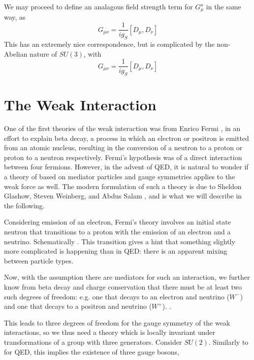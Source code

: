 We may proceed to define an analagous field strength term for $G_{\mu}^{a}$ in the same way, as
\begin{equation}
G_{\mu\nu} = \frac{1}{ig_{S}}[D_{\mu}, D_{\nu}]
\end{equation}
This has an extremely nice correspondence, but is complicated by the non-Abelian nature of $SU(3)$, with
\begin{equation}
G_{\mu\nu} = \frac{1}{ig_{S}}[D_{\mu}, D_{\nu}]
\end{equation}

\section{The Weak Interaction}
One of the first theories of the weak interaction was from Enrico Fermi , in an effort to 
explain beta decay, a process in which an electron or positron is emitted from an atomic nucleus, resulting 
in the conversion of a neutron to a proton or proton to a neutron respectively. Fermi's hypothesis was 
of a direct interaction between four fermions. However, in the advent of QED, it is natural to wonder if 
a theory of based on mediator particles and gauge symmetries applies to the weak force as well. The modern formulation 
of such a theory is due to Sheldon Glashow, Steven Weinberg, and Abdus Salam , and is what we will 
describe in the following.

Considering emission of an electron, Fermi's theory involves an initial state neutron that transitions 
to a proton with the emission of an electron and a neutrino. Schematically . 
This transition gives a hint that something slightly more complicated is happening than in QED: there is 
an apparent mixing between particle types. 

Now, with the assumption there are mediators for such an interaction, we further know from beta decay and 
charge conservation that there must be at least two such degrees of freedom: e.g. one that decays to an electron 
and neutrino ($W^{-}$) and one that decays to a positron and neutrino ($W^{+}$). .

This leads to three degrees of freedom for the gauge symmetry of the weak interactions, so we thus need a theory 
which is locally invariant under transformations of a group with three generators. Consider $SU(2)$. Similarly 
to for QED, this implies the existence of three gauge bosons,  




